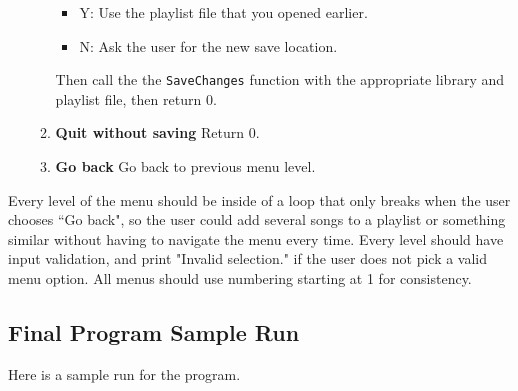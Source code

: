 \begin{enumerate}
\begin{enumerate}
                \begin{itemize}
                    \item Y: Use the playlist file that you opened earlier.
                    \item N: Ask the user for the new save location.
                \end{itemize}
                Then call the the \texttt{SaveChanges} function with the appropriate library and playlist file, then return 0.
            \item \textbf{Quit without saving} Return 0.
            \item \textbf{Go back} Go back to previous menu level.
        \end{enumerate}
\end{enumerate}

Every level of the menu should be inside of a loop that only breaks when the user chooses ``Go back", so the user could add several songs to a playlist or something similar without having to navigate the menu every time. Every level should have input validation, and print "Invalid selection." if the user does not pick a valid menu option. All menus should use numbering starting at 1 for consistency. 

\subsection{Final Program Sample Run}

Here is a sample run for the program.

